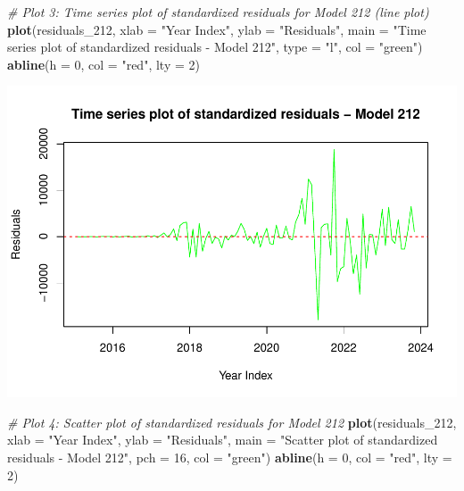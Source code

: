 \documentclass[
]{book}
\newenvironment{Shaded}{\begin{snugshade}}{\end{snugshade}}
\newcommand{\AttributeTok}[1]{\textcolor[rgb]{0.13,0.29,0.53}{#1}}
\newcommand{\CommentTok}[1]{\textcolor[rgb]{0.56,0.35,0.01}{\textit{#1}}}
\newcommand{\DecValTok}[1]{\textcolor[rgb]{0.00,0.00,0.81}{#1}}
\newcommand{\FunctionTok}[1]{\textcolor[rgb]{0.13,0.29,0.53}{\textbf{#1}}}
\newcommand{\NormalTok}[1]{#1}
\newcommand{\StringTok}[1]{\textcolor[rgb]{0.31,0.60,0.02}{#1}}
\begin{document}
\begin{Shaded}
\begin{Highlighting}[]
\CommentTok{\# Plot 3: Time series plot of standardized residuals for Model 212 (line plot)}
\FunctionTok{plot}\NormalTok{(residuals\_212,}
     \AttributeTok{xlab =} \StringTok{"Year Index"}\NormalTok{, }\AttributeTok{ylab =} \StringTok{"Residuals"}\NormalTok{,}
     \AttributeTok{main =} \StringTok{"Time series plot of standardized residuals {-} Model 212"}\NormalTok{,}
     \AttributeTok{type =} \StringTok{"l"}\NormalTok{, }\AttributeTok{col =} \StringTok{"green"}\NormalTok{)}
\FunctionTok{abline}\NormalTok{(}\AttributeTok{h =} \DecValTok{0}\NormalTok{, }\AttributeTok{col =} \StringTok{"red"}\NormalTok{, }\AttributeTok{lty =} \DecValTok{2}\NormalTok{)}
\end{Highlighting}
\end{Shaded}

\includegraphics{bookdown-demo_files/figure-latex/unnamed-chunk-48-3.pdf}

\begin{Shaded}
\begin{Highlighting}[]
\CommentTok{\# Plot 4: Scatter plot of standardized residuals for Model 212}
\FunctionTok{plot}\NormalTok{(residuals\_212,}
     \AttributeTok{xlab =} \StringTok{"Year Index"}\NormalTok{, }\AttributeTok{ylab =} \StringTok{"Residuals"}\NormalTok{,}
     \AttributeTok{main =} \StringTok{"Scatter plot of standardized residuals {-} Model 212"}\NormalTok{,}
     \AttributeTok{pch =} \DecValTok{16}\NormalTok{, }\AttributeTok{col =} \StringTok{"green"}\NormalTok{)}
\FunctionTok{abline}\NormalTok{(}\AttributeTok{h =} \DecValTok{0}\NormalTok{, }\AttributeTok{col =} \StringTok{"red"}\NormalTok{, }\AttributeTok{lty =} \DecValTok{2}\NormalTok{)}
\end{Highlighting}
\end{Shaded}
\end{document}
